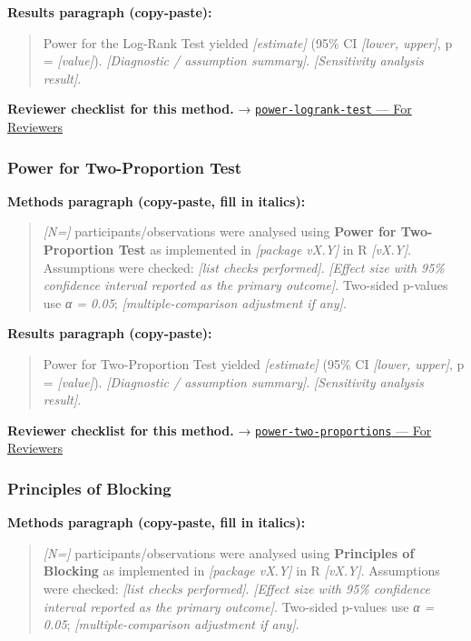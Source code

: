 \documentclass[
]{article}
\begin{document}
\textbf{Results paragraph (copy-paste):}

\begin{quote}
Power for the Log-Rank Test yielded \emph{{[}estimate{]}} (95\% CI
\emph{{[}lower, upper{]}}, p = \emph{{[}value{]}}). \emph{{[}Diagnostic
/ assumption summary{]}}. \emph{{[}Sensitivity analysis result{]}}.
\end{quote}

\textbf{Reviewer checklist for this method.} →
\href{../chapters/05-power/power-logrank-test.Rmd\#for-reviewers}{\texttt{power-logrank-test}
--- For Reviewers}

\subsubsection{Power for Two-Proportion
Test}\label{power-for-two-proportion-test}

\textbf{Methods paragraph (copy-paste, fill in italics):}

\begin{quote}
\emph{{[}N={]}} participants/observations were analysed using
\textbf{Power for Two-Proportion Test} as implemented in
\emph{{[}package vX.Y{]}} in R \emph{{[}vX.Y{]}}. Assumptions were
checked: \emph{{[}list checks performed{]}}. \emph{{[}Effect size with
95\% confidence interval reported as the primary outcome{]}}. Two-sided
p-values use \emph{α = 0.05}; \emph{{[}multiple-comparison adjustment if
any{]}}.
\end{quote}

\textbf{Results paragraph (copy-paste):}

\begin{quote}
Power for Two-Proportion Test yielded \emph{{[}estimate{]}} (95\% CI
\emph{{[}lower, upper{]}}, p = \emph{{[}value{]}}). \emph{{[}Diagnostic
/ assumption summary{]}}. \emph{{[}Sensitivity analysis result{]}}.
\end{quote}

\textbf{Reviewer checklist for this method.} →
\href{../chapters/05-power/power-two-proportions.Rmd\#for-reviewers}{\texttt{power-two-proportions}
--- For Reviewers}

\subsubsection{Principles of Blocking}\label{principles-of-blocking}

\textbf{Methods paragraph (copy-paste, fill in italics):}

\begin{quote}
\emph{{[}N={]}} participants/observations were analysed using
\textbf{Principles of Blocking} as implemented in \emph{{[}package
vX.Y{]}} in R \emph{{[}vX.Y{]}}. Assumptions were checked: \emph{{[}list
checks performed{]}}. \emph{{[}Effect size with 95\% confidence interval
reported as the primary outcome{]}}. Two-sided p-values use \emph{α =
0.05}; \emph{{[}multiple-comparison adjustment if any{]}}.
\end{quote}
\end{document}
